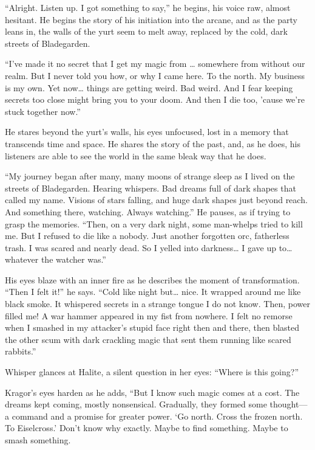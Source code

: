 \documentclass[
  letterpaper,12pt,twoside,twocolumn,openany,
  nodeprecatedcode,bg=full]{dndbook}
\begin{document}
``Alright. Listen up. I got something to say,'' he begins, his voice
raw, almost hesitant. He begins the story of his initiation into the
arcane, and as the party leans in, the walls of the yurt seem to melt
away, replaced by the cold, dark streets of Bladegarden.

``I've made it no secret that I get my magic from \ldots{} somewhere
from without our realm. But I never told you how, or why I came here. To
the north. My business is my own. Yet now\ldots{} things are getting
weird. Bad weird. And I fear keeping secrets too close might bring you
to your doom. And then I die too, 'cause we're stuck together now.''

He stares beyond the yurt's walls, his eyes unfocused, lost in a memory
that transcends time and space. He shares the story of the past, and, as
he does, his listeners are able to see the world in the same bleak way
that he does.

``My journey began after many, many moons of strange sleep as I lived on
the streets of Bladegarden. Hearing whispers. Bad dreams full of dark
shapes that called my name. Visions of stars falling, and huge dark
shapes just beyond reach. And something there, watching. Always
watching.'' He pauses, as if trying to grasp the memories. ``Then, on a
very dark night, some man-whelps tried to kill me. But I refused to die
like a nobody. Just another forgotten orc, fatherless trash. I was
scared and nearly dead. So I yelled into darkness\ldots{} I gave up
to\ldots{} whatever the watcher was.''

His eyes blaze with an inner fire as he describes the moment of
transformation. ``Then I felt it!'' he says. ``Cold like night
but\ldots{} nice. It wrapped around me like black smoke. It whispered
secrets in a strange tongue I do not know. Then, power filled me! A war
hammer appeared in my fist from nowhere. I felt no remorse when I
smashed in my attacker's stupid face right then and there, then blasted
the other scum with dark crackling magic that sent them running like
scared rabbits.''

Whisper glances at Halite, a silent question in her eyes: ``Where is
this going?''

Kragor's eyes harden as he adds, ``But I know such magic comes at a
cost. The dreams kept coming, mostly nonsensical. Gradually, they formed
some thought--- a command and a promise for greater power. `Go north.
Cross the frozen north. To Eiselcross.' Don't know why exactly. Maybe to
find something. Maybe to smash something.
\end{document}
